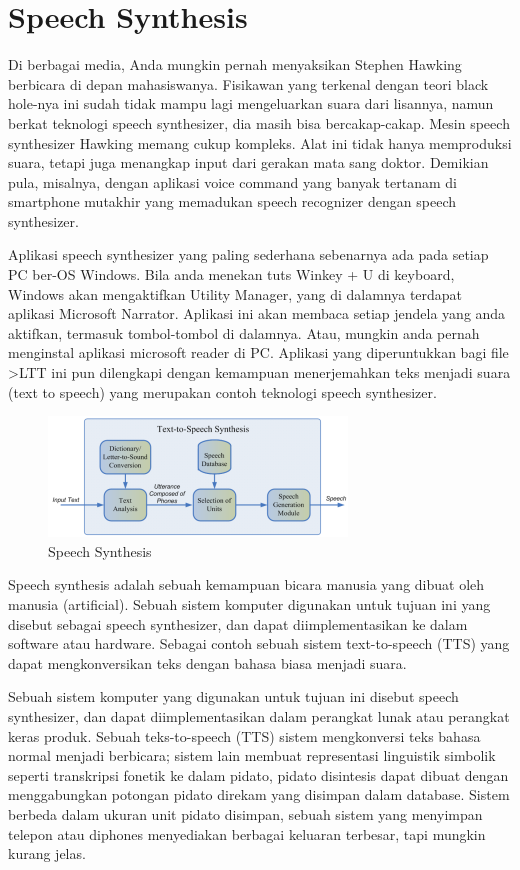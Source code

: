 \section{Speech Synthesis}
Di berbagai media, Anda mungkin pernah menyaksikan Stephen Hawking berbicara di depan mahasiswanya. Fisikawan yang terkenal dengan teori black hole-nya ini sudah tidak mampu lagi mengeluarkan suara dari lisannya, namun berkat teknologi speech synthesizer, dia masih bisa bercakap-cakap. Mesin speech synthesizer Hawking memang cukup kompleks. Alat ini tidak hanya memproduksi suara, tetapi juga menangkap input dari gerakan mata sang doktor. Demikian pula, misalnya, dengan aplikasi voice command yang banyak tertanam di smartphone mutakhir yang memadukan speech recognizer dengan speech synthesizer.

Aplikasi speech synthesizer yang paling sederhana sebenarnya ada pada setiap PC ber-OS Windows. Bila anda menekan tuts Winkey + U di keyboard, Windows akan mengaktifkan Utility Manager, yang di dalamnya terdapat aplikasi Microsoft Narrator. Aplikasi ini akan membaca setiap jendela yang anda aktifkan, termasuk tombol-tombol di dalamnya. Atau, mungkin anda pernah menginstal aplikasi microsoft reader di PC. Aplikasi yang diperuntukkan bagi file >LTT ini pun dilengkapi dengan kemampuan menerjemahkan teks menjadi suara (text to speech) yang merupakan contoh teknologi speech synthesizer.

\begin{figure}[H]
        \centerline{\includegraphics[scale=.75]{figures/speech}}
        \caption{Speech Synthesis}
		\label{speech}
\end{figure}

Speech synthesis adalah sebuah kemampuan bicara manusia yang dibuat oleh manusia (artificial). Sebuah sistem komputer digunakan untuk tujuan ini yang disebut sebagai speech synthesizer, dan dapat diimplementasikan ke dalam software atau hardware. Sebagai contoh sebuah sistem text-to-speech (TTS) yang dapat mengkonversikan teks dengan bahasa biasa menjadi suara\cite{8682816}.

Sebuah sistem komputer yang digunakan untuk tujuan ini disebut speech synthesizer, dan dapat diimplementasikan dalam perangkat lunak atau perangkat keras produk. Sebuah teks-to-speech (TTS) sistem mengkonversi teks bahasa normal menjadi berbicara; sistem lain membuat representasi linguistik simbolik seperti transkripsi fonetik ke dalam pidato, pidato disintesis dapat dibuat dengan menggabungkan potongan pidato direkam yang disimpan dalam database. Sistem berbeda dalam ukuran unit pidato disimpan, sebuah sistem yang menyimpan telepon atau diphones menyediakan berbagai keluaran terbesar, tapi mungkin kurang jelas\cite{li2017deep}.

